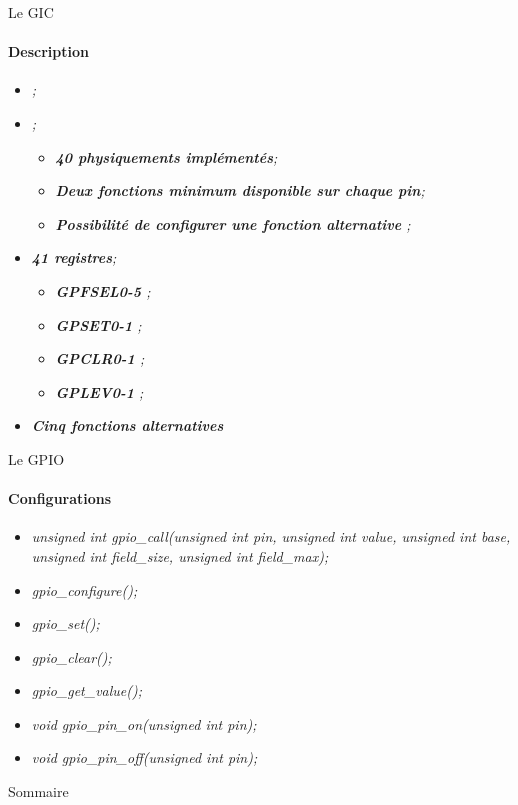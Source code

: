 \documentclass[french]{beamer}
\begin{document}
\begin{frame}{Le GIC}
	\framesubtitle{Description}
	\begin{beamerboxesrounded}[scheme=blocgrisclair]{}
		\begin{center}
			\begin{itemize}
				\color{nb}
				\large
				\item<1-> \textit{;}
				\item<2-> \textit{;}
				\begin{itemize}
					\color{white}
					\item<3-> \textit{\textbf{40 physiquements implémentés};}
					\item<4-> \textit{\textbf{Deux fonctions minimum disponible sur chaque pin};}
					\item<5-> \textit{\textbf{Possibilité de configurer une fonction alternative} ;}
				\end{itemize}
				\item<6-> \textit{\textbf{41 registres};}
				\begin{itemize}
					\color{white}
					\item<7-> \textit{\textbf{GPFSEL{0-5}} ;}
					\item<8-> \textit{\textbf{GPSET{0-1}} ;}
					\item<9-> \textit{\textbf{GPCLR{0-1}} ;}
					\item<10-> \textit{\textbf{GPLEV{0-1}} ;}
				\end{itemize}
				\item<11-> \textit{\textbf{Cinq fonctions alternatives}}
			\end{itemize}
		\end{center}
	\end{beamerboxesrounded}
\end{frame}

\begin{frame}{Le GPIO}
	\framesubtitle{Configurations}
	\begin{beamerboxesrounded}[scheme=blocgrisclair]{}
		\begin{center}
			\begin{itemize}
				\color{nb}
				\large
				\item<1-> \textit{unsigned int gpio\_call(unsigned int pin, unsigned int value, unsigned int base, unsigned int field\_size, unsigned int field\_max);}
				\item<2-> \textit{gpio\_configure();}
				\item<3-> \textit{gpio\_set();}
				\item<4-> \textit{gpio\_clear();}
				\item<5-> \textit{gpio\_get\_value();}
				\item<6-> \textit{void gpio\_pin\_on(unsigned int  pin);}
				\item<7-> \textit{void gpio\_pin\_off(unsigned int pin);}
			\end{itemize}
		\end{center}
	\end{beamerboxesrounded}
\end{frame}

\begin{frame}{Sommaire}
	\tableofcontents
\end{frame}
\end{document}
